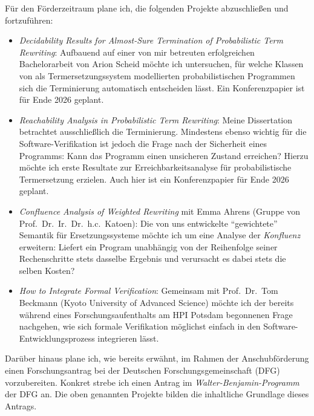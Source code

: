 Für den Förderzeitraum plane ich, die folgenden Projekte abzuschließen und fortzuführen:

\begin{itemize}
    \item \emph{Decidability Results for Almost-Sure Termination of Probabilistic Term Rewriting}: Aufbauend auf einer von mir betreuten erfolgreichen Bachelorarbeit von Arion Scheid möchte ich untersuchen, für welche Klassen von als Termersetzungssystem modellierten probabilistischen Programmen sich die Terminierung automatisch entscheiden lässt. Ein Konferenzpapier ist für Ende 2026 geplant.
    \item \emph{Reachability Analysis in Probabilistic Term Rewriting}: Meine Dissertation betrachtet ausschließlich die Terminierung. Mindestens ebenso wichtig für die Software-Verifikation ist jedoch die Frage nach der Sicherheit eines Programms: Kann das Programm einen unsicheren Zustand erreichen? Hierzu möchte ich erste Resultate zur Erreichbarkeitsanalyse für probabilistische Termersetzung erzielen. Auch hier ist ein Konferenzpapier für Ende 2026 geplant.
    \item \emph{Confluence Analysis of Weighted Rewriting} mit Emma Ahrens (Gruppe von Prof.\ Dr.\ Ir.\ Dr.\ h.c.\ Katoen): Die von uns entwickelte ``gewichtete'' Semantik für Ersetzungssysteme möchte ich um eine Analyse der \emph{Konfluenz} erweitern: Liefert ein Program unabhängig von der Reihenfolge seiner Rechenschritte stets dasselbe Ergebnis und verursacht es dabei stets die selben Kosten?
    \item \emph{How to Integrate Formal Verification}: Gemeinsam mit Prof.\ Dr.\ Tom Beckmann (Kyoto University of Advanced Science) möchte ich der bereits während eines Forschungsaufenthalts am HPI Potsdam begonnenen Frage nachgehen, wie sich formale Verifikation möglichst einfach in den Software-Entwicklungsprozess integrieren lässt.
\end{itemize}

Darüber hinaus plane ich, wie bereits erwähnt, im Rahmen der Anschubförderung einen Forschungsantrag bei der Deutschen Forschungsgemeinschaft (DFG) vorzubereiten.
Konkret strebe ich einen Antrag im \emph{Walter-Benjamin-Programm} der DFG an.
Die oben genannten Projekte bilden die inhaltliche Grundlage dieses Antrags.

